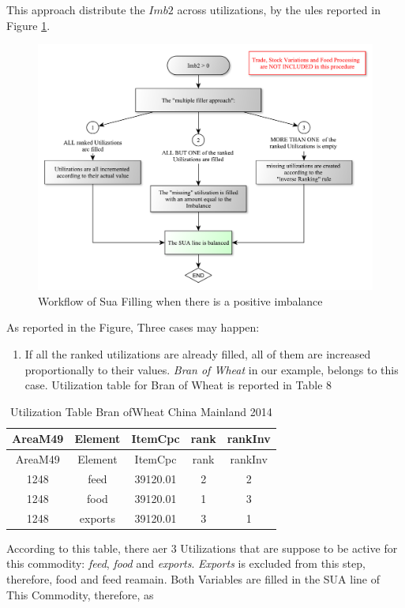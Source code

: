 \documentclass[]{article}
\providecommand{\tightlist}{%
  \setlength{\itemsep}{0pt}\setlength{\parskip}{0pt}}
\begin{document}
This approach distribute the \(Imb2\) across utilizations, by the ules
reported in Figure \ref{fig:f7}.

\begin{figure}

{\centering \includegraphics{images/07_PositiveImbalance} 

}

\caption{\label{fig:f5}Workflow of Sua Filling when there is a positive imbalance}\label{fig:f7}
\end{figure}

As reported in the Figure, Three cases may happen:

\begin{enumerate}
\def\labelenumi{\arabic{enumi}.}
\tightlist
\item
  If all the ranked utilizations are already filled, all of them are
  increased proportionally to their values. \emph{Bran of Wheat} in our
  example, belongs to this case. Utilization table for Bran of Wheat is
  reported in Table 8
\end{enumerate}

\begin{longtable}[]{@{}ccccc@{}}
\caption{Utilization Table Bran ofWheat China Mainland
2014}\tabularnewline
\toprule
AreaM49 & Element & ItemCpc & rank & rankInv\tabularnewline
\midrule
\endfirsthead
\toprule
AreaM49 & Element & ItemCpc & rank & rankInv\tabularnewline
\midrule
\endhead
1248 & feed & 39120.01 & 2 & 2\tabularnewline
1248 & food & 39120.01 & 1 & 3\tabularnewline
1248 & exports & 39120.01 & 3 & 1\tabularnewline
\bottomrule
\end{longtable}

According to this table, there aer 3 Utilizations that are suppose to be
active for this commodity: \emph{feed}, \emph{food} and \emph{exports}.
\emph{Exports} is excluded from this step, therefore, food and feed
reamain. Both Variables are filled in the SUA line of This Commodity,
therefore, as
\end{document}
